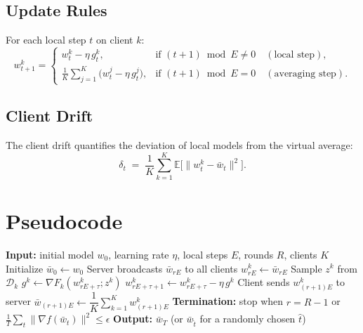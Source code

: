 \documentclass[11pt]{article}
\begin{document}
\subsection*{Update Rules}
For each local step $t$ on client $k$:
\[
w_{t+1}^{k} =
\begin{cases}
w_t^k - \eta\, g_t^k, & \text{if } (t+1) \bmod E \neq 0 \quad (\text{local step}),\\[4pt]
\displaystyle \frac{1}{K}\sum_{j=1}^{K}\big(w_t^j - \eta\, g_t^j\big),
& \text{if } (t+1) \bmod E = 0 \quad (\text{averaging step}).
\end{cases}
\]

\subsection*{Client Drift}
The client drift quantifies the deviation of local models from the virtual
average:
\[
\delta_t \;=\; \frac{1}{K}\sum_{k=1}^{K}
\mathbb{E}\big[\|w_t^k - \bar{w}_t\|^2\big].
\]

\section*{Pseudocode}

\begin{algorithm}[H]
\caption{Federated Averaging (FedAvg) with Local SGD}
\begin{algorithmic}[1]
\State \textbf{Input:} initial model $w_0$, learning rate $\eta$, local steps $E$,
       rounds $R$, clients $K$
\State Initialize $\bar{w}_0 \gets w_0$
    \State Server broadcasts $\bar{w}_{rE}$ to all clients
        \State $w_{rE}^k \gets \bar{w}_{rE}$
            \State Sample $z^k$ from $\mathcal{D}_k$
            \State $g^k \gets \nabla F_k(w_{rE+\tau}^k; z^k)$
            \State $w_{rE+\tau+1}^k \gets w_{rE+\tau}^k - \eta\, g^k$
        \EndFor
        \State Client sends $w_{(r+1)E}^k$ to server
    \EndFor
    \State $\bar{w}_{(r+1)E} \gets \dfrac{1}{K}\sum_{k=1}^{K} w_{(r+1)E}^k$
\EndFor
\State \textbf{Termination:} stop when $r = R-1$ or
       $\frac{1}{T}\sum_t \|\nabla f(\bar{w}_t)\|^2 \le \epsilon$
\State \textbf{Output:} $\bar{w}_T$ (or $\bar{w}_{\hat t}$ for a randomly chosen $\hat t$)
\end{algorithmic}
\end{algorithm}
\end{document}

